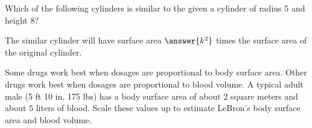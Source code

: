 \documentclass[nooutcomes]{ximera}
\begin{document}
\begin{question}
Which of the following cylinders is similar to the given a cylinder of radius 5 and height 8?  
\begin{selectAll}
\end{selectAll}

The similar cylinder will have surface area $\answer{k^2}$ times the surface area of the original cylinder.  
\end{question}

\begin{problem}
Some drugs work best when dosages are proportional to body surface area.  Other drugs work best when dosages are proportional to blood volume.  A typical adult male (5 ft 10 in, 175 lbs)  has a body surface area of about 2 square meters and about 5 liters of blood.  Scale these values up to estimate LeBron's body surface area and blood volume.  
\end{problem}

\end{document}
